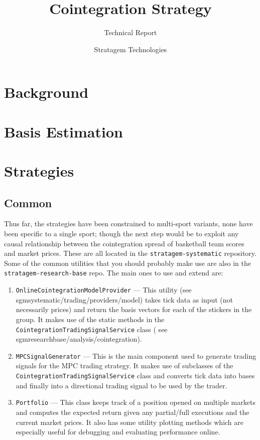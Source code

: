 \documentclass[a4paper]{scrreprt}
\title{Cointegration Strategy}
\subtitle{Technical Report}
\author{Stratagem Technologies}
\begin{document}
\maketitle


\chapter{Background}



\chapter{Basis Estimation}



\chapter{Strategies}\label{ch:signals}
\section{Common}
Thus far, the strategies have been constrained to multi-sport variants, none
have been specific to a single sport; though the next step would be to exploit
any causal relationship between the cointegration spread of basketball team
scores and market prices. These are all located in the
\texttt{stratagem-systematic} repository. Some of the common
utilities that you should probably make use are also in the
\texttt{stratagem-research-base} repo. The main ones to use and extend are:
\begin{enumerate}
    \item \texttt{OnlineCointegrationModelProvider} --- This
        utility (see sgmsystematic/trading/providers/model) takes tick data as
        input (not necessarily prices) and return the basis vectors for each of
        the stickers in the group. It makes use of the static methods in the
        \texttt{CointegrationTradingSignalService} class ( see
        sgmresearchbase/analysis/cointegration).
    \item \texttt{MPCSignalGenerator} --- This is the main
        component used to generate trading signals for the MPC trading
        strategy. It makes use of subclasses of the
        \texttt{CointegrationTradingSignalService} class and
        converts tick data into bases and finally into a directional trading
        signal to be used by the trader.
    \item \texttt{Portfolio} --- This class keeps track of a
        position opened on multiple markets and computes the expected return
        given any partial/full executions and the current market prices. It
        also has some utility plotting methods which are especially useful for
        debugging and evaluating performance online.
\end{enumerate}
\end{document}
